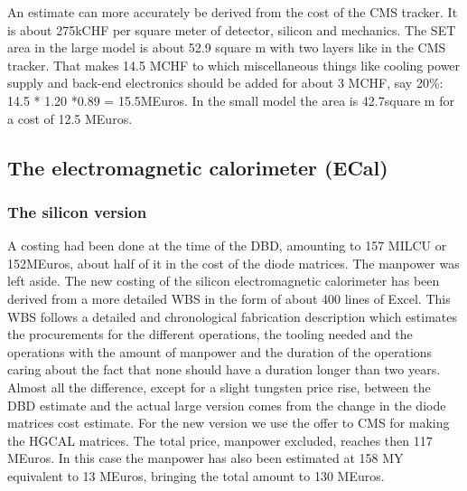 An estimate can more accurately be derived from the cost of the CMS tracker. It is about 275kCHF per square meter of detector, silicon and mechanics. The SET area in the large model is about 52.9 square m with two layers like in the CMS tracker. That makes 14.5 MCHF to which miscellaneous things like cooling power supply and back-end electronics should be added for about 3 MCHF, say 20\%: 14.5 * 1.20 *0.89 = 15.5MEuros. 
In  the  small model the area is 42.7square m for a cost of 12.5 MEuros.

\subsection{The electromagnetic calorimeter (ECal)}
\subsubsection{The silicon version}
A costing had been done at the time of the DBD, amounting to 157 MILCU or 152MEuros, about half of it in the cost of the diode matrices. The manpower was left aside.
The new costing of the silicon electromagnetic calorimeter has been derived from a more detailed WBS in the form of about 400 lines of Excel. This WBS follows a detailed and chronological fabrication description which estimates the procurements for the different operations, the tooling needed and the operations with the amount of manpower and the duration of the operations caring about the fact that none should have a duration longer than two years. 
Almost all the difference, except for a slight tungsten price rise, between the DBD estimate and the actual large version comes from the change in the diode matrices cost estimate. For the new version we use the offer to CMS for making the HGCAL matrices. The total price, manpower excluded, reaches then 117 MEuros. In this case the manpower has also been estimated at 158 MY equivalent to 13 MEuros, bringing the total amount to 130 MEuros.

